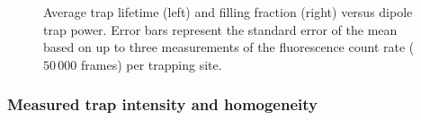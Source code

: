 \documentclass[../Thesis-IJspeert.tex]{subfiles}
\begin{document}
\begin{figure}[t]
	\caption[An example of a floating figure]{Average trap lifetime (left) and filling fraction (right) versus dipole trap power. Error bars represent the standard error of the mean based on up to three measurements of the fluorescence count rate ($50\,000$ frames) per trapping site.} %
	\label{fig:LTandFR} 
\end{figure}


\subsubsection{Measured trap intensity and homogeneity}
\end{document}
